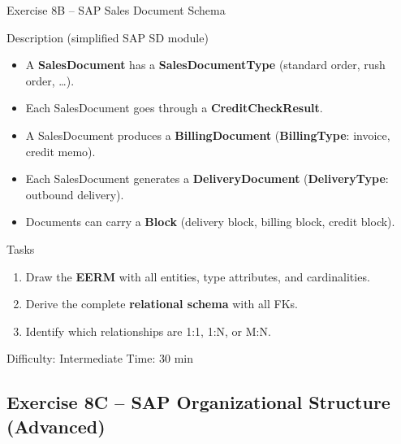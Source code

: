 \documentclass[10pt]{beamer}
\begin{document}
\begin{frame}{Exercise 8B -- SAP Sales Document Schema}
  \begin{block}{Description (simplified SAP SD module)}
    \begin{itemize}
      \item A \textbf{SalesDocument} has a \textbf{SalesDocumentType} (standard order, rush order, \ldots).
      \item Each SalesDocument goes through a \textbf{CreditCheckResult}.
      \item A SalesDocument produces a \textbf{BillingDocument} (\textbf{BillingType}: invoice, credit memo).
      \item Each SalesDocument generates a \textbf{DeliveryDocument} (\textbf{DeliveryType}: outbound delivery).
      \item Documents can carry a \textbf{Block} (delivery block, billing block, credit block).
    \end{itemize}
  \end{block}

  \begin{block}{Tasks}
    \begin{enumerate}
      \item Draw the \textbf{EERM} with all entities, type attributes, and cardinalities.
      \item Derive the complete \textbf{relational schema} with all FKs.
      \item Identify which relationships are 1:1, 1:N, or M:N.
    \end{enumerate}
  \end{block}

  \begin{alertblock}{Difficulty: Intermediate \quad Time: 30 min}
  \end{alertblock}
\end{frame}

\subsection{Exercise 8C -- SAP Organizational Structure (Advanced)}
\end{document}
